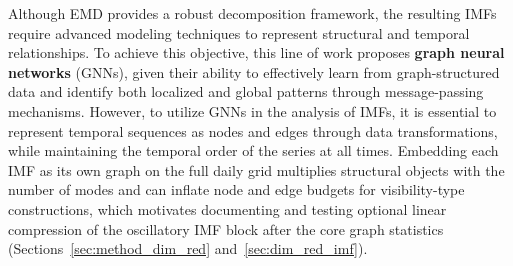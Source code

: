 \documentclass[11pt,a4paper]{article}
\begin{document}
Although EMD provides a robust decomposition framework, the resulting IMFs require advanced modeling techniques to represent structural and temporal relationships. To achieve this objective, this line of work proposes \textbf{graph neural networks} (GNNs), given their ability to effectively learn from graph-structured data and identify both localized and global patterns through message-passing mechanisms. However, to utilize GNNs in the analysis of IMFs, it is essential to represent temporal sequences as nodes and edges through data transformations, while maintaining the temporal order of the series at all times. Embedding each IMF as its own graph on the full daily grid multiplies structural objects with the number of modes and can inflate node and edge budgets for visibility-type constructions, which motivates documenting and testing optional linear compression of the oscillatory IMF block after the core graph statistics (Sections~\ref{sec:method_dim_red} and~\ref{sec:dim_red_imf}).
\end{document}
